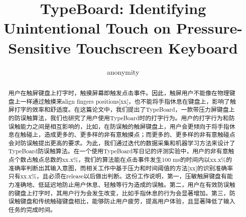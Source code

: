 \documentclass[acmlarge]{acmart}
\begin{document}
\begin{CJK*}{UTF8}{gbsn}
		

\title{TypeBoard: Identifying Unintentional Touch on Pressure-Sensitive Touchscreen Keyboard}

\author{anonymity}


\renewcommand{\shortauthors}{Trovato and Tobin, et al.}

\begin{abstract}

用户在触屏键盘上打字时，触摸屏幕即触发点击事件。因此，触屏用户不能像在物理键盘上一样通过触摸来align fingers positions[xx]，也不能将手指休息在键盘上，影响了触屏打字的效率和舒适度。在这篇论文中，我们提出了TypeBoard，一款带压力屏键盘上的防误触算法，我们也研究了用户使用TypeBoard时的打字行为。用户的打字行为和防误触能力之间是相互影响的，比如，在防误触的触屏键盘上，用户会更倾向于将手指休息在触碰上，造成更多的、更多样的非有意触摸点；而更多的、更多样的非有意触碰点会对防误触提出更高的要求。为此，我们通过迭代的数据采集和机器学习方法来设计了TypeBoard防误触算法。在一个使用TypeBoard写日记的评测实验中，用户的非有意触点个数占触点总数的xx.x\%，我们的算法能在点击事件发生100 ms的时间内以xx.x\%的准确率判断出其输入意图，而相关工作中基于压力和时间阈值的方法[xx]的识别准确率只有xx.x\%，且必须在release以后做出判断。这份工作说明，第一，压敏触屏键盘有能力准确地、低延迟地防止用户休息、轻触等行为造成的误触。第二，用户在有效防误触的键盘上打字时，其用户行为会发生改变，比如手指休息的行为会显著增加。第三，防误触键盘和传统触碰键盘相比，能够防止用户疲劳，提高用户体验，且显著降低了输入任务的完成时间。

\end{abstract}


\end{CJK*}
\end{document}
